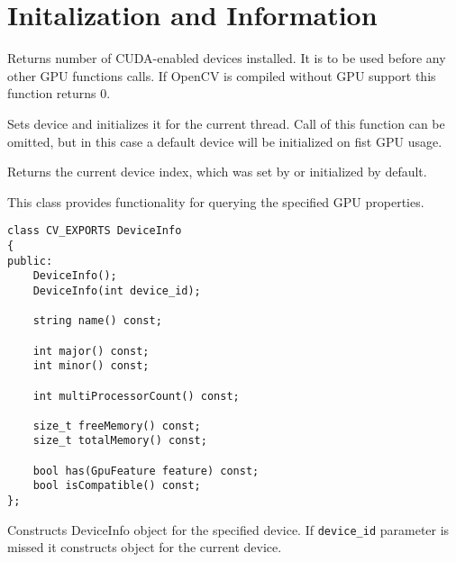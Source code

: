 \section{Initalization and Information}


Returns number of CUDA-enabled devices installed. It is to be used before any other GPU functions calls. If OpenCV is compiled without GPU support this function returns 0. 



Sets device and initializes it for the current thread. Call of this function can be omitted, but in this case a default device will be initialized on fist GPU usage.

\begin{description}
\end{description}


Returns the current device index, which was set by  or initialized by default.



This class provides functionality for querying the specified GPU properties. 

\begin{lstlisting}
class CV_EXPORTS DeviceInfo
{
public:
    DeviceInfo();
    DeviceInfo(int device_id);

    string name() const;

    int major() const;
    int minor() const;

    int multiProcessorCount() const;

    size_t freeMemory() const;
    size_t totalMemory() const;

    bool has(GpuFeature feature) const;
    bool isCompatible() const;
};
\end{lstlisting}


Constructs DeviceInfo object for the specified device. If \texttt{device\_id} parameter is missed it constructs object for the current device.

\begin{description}
\end{description}


